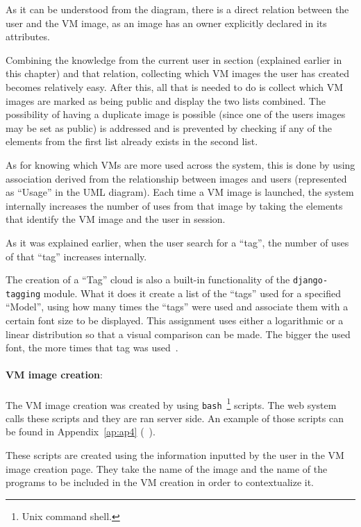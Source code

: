 As it can be understood from the diagram, there is a direct relation between the user and the VM image, as an image has an owner explicitly declared in its attributes.

Combining the knowledge from the current user in section (explained earlier in this chapter) and that relation, collecting which VM images the user has created becomes relatively easy. After this, all that is needed to do is collect which VM images are marked as being public and display the two lists combined. The possibility of having a duplicate image is possible (since one of the users images may be set as public) is addressed and is prevented by checking if any of the elements from the first list already exists in the second list.

As for knowing which VMs are more used across the system, this is done by using association derived from the relationship between images and users (represented as ``Usage'' in the UML diagram). Each time a VM image is launched, the system internally increases the number of uses from that image by taking the elements that identify the VM image and the user in session. 

As it was explained earlier, when the user search for a ``tag'', the number of uses of that ``tag'' increases internally.

The creation of a ``Tag'' cloud is also a built-in functionality of the \texttt{django-tagging} module. What it does it create a list of the ``tags'' used for a specified ``Model'', using how many times the ``tags'' were used and associate them with a certain font size to be displayed. This assignment uses either a logarithmic or a linear distribution so that a visual comparison can be made. The bigger the used font, the more times that tag was used~\cite{http://django-tagging.googlecode.com/svn/trunk/docs/overview.txt}.\\
\ \\
\textbf{VM image creation}:\\
\ \\
The VM image creation was created by using \texttt{bash}~\footnote{Unix command shell.} scripts. The web system calls these scripts and they are ran server side. An example of those scripts can be found in Appendix~\ref{ap:ap4} (~).

These scripts are created using the information inputted by the user in the VM image creation page. They take the name of the image and the name of the programs to be included in the VM creation in order to contextualize it. 

